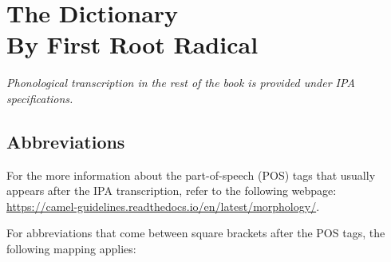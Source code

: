\documentclass[11pt]{book}
\begin{document}




\mainmatter
\chapter*{\normalfont\fontsize{40}{40}\selectfont \textbf{The Dictionary \\ {\normalfont\fontsize{30}{30}\selectfont By First Root Radical}}}
%

\textit{Phonological transcription in the rest of the book is provided under IPA specifications.}
\thispagestyle{empty}

\newpage
\thispagestyle{empty}
\section*{Abbreviations}
%

For the more information about the part-of-speech (POS) tags that usually appears after the IPA transcription, refer to the following webpage: \url{https://camel-guidelines.readthedocs.io/en/latest/morphology/}.

\vspace{5mm}
For abbreviations that come between square brackets after the POS tags, the following mapping applies:
\end{document}
